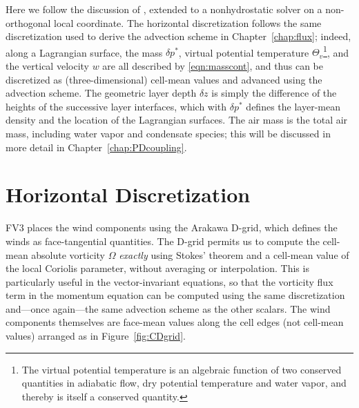 \documentclass[10pt,letterpaper,margin=1in]{memoir}
\begin{document}
Here we follow the discussion of \citet{LR97}, extended to a nonhydrostatic solver on a non-orthogonal local coordinate. The horizontal discretization follows the same discretization used to derive the advection scheme in Chapter~\ref{chap:flux}; indeed, along a Lagrangian surface, the mass $\delta p^*$, virtual potential temperature $\Theta_v$\footnote{The virtual potential temperature is an algebraic function of two conserved quantities in adiabatic flow, dry potential temperature and water vapor, and thereby is itself a conserved quantity.}, and the vertical velocity $w$ are all described by \eqref{eqn:masscont}, and thus can be discretized as (three-dimensional) cell-mean values and advanced using the advection scheme. The geometric layer depth $\delta z$ is simply the difference of the heights of the successive layer interfaces, which with $\delta p^*$ defines the layer-mean density and the location of the Lagrangian surfaces. The air mass is the total air mass, including water vapor and condensate species; this will be discussed in more detail in Chapter~\ref{chap:PDcoupling}.

\section{Horizontal Discretization} \label{sec:horizdiscr}

FV3 places the wind components using the Arakawa D-grid, which defines the winds as face-tangential quantities.
The D-grid permits us to compute the cell-mean absolute vorticity $\Omega$ \textit{exactly} using Stokes' theorem and a cell-mean value of the local Coriolis parameter, without averaging or interpolation. This is particularly useful in the vector-invariant equations, so that the vorticity flux term in the momentum equation can be computed using the same discretization and---once again---the same advection scheme as the other scalars. The wind components themselves are face-mean values along the cell edges (not cell-mean values) arranged as in Figure~\ref{fig:CDgrid}. 
\end{document}
